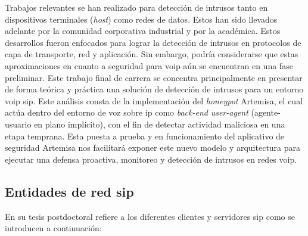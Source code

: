 \documentclass[a4paper,12pt]{report}
\begin{document}
Trabajos relevantes se han realizado para detección de intrusos tanto en
dispositivos terminales (\emph{host}) como redes de datos. Estos han sido
llevados adelante por la comunidad corporativa industrial y por la académica.
Estos desarrollos fueron enfocados para lograr la detección de
intrusos en protocolos de capa de transporte, red y aplicación. Sin embargo,
podría considerarse que estas aproximaciones en cuanto a seguridad para
\ac{voip} aún se encuentran en una fase \mbox{preliminar}. Este trabajo final de carrera
se concentra principalmente en presentar de forma teórica y práctica una
solución de detección de intrusos para un entorno \ac{voip} \ac{sip}.                
Este análisis consta de la implementación del \emph{honeypot} Artemisa, el
cual actúa dentro del entorno de voz sobre \ac{ip} como \emph{back-end} \emph{user-agent}
(agente-usuario en plano implícito), con el fin de detectar actividad maliciosa
en una etapa temprana. Esta puesta a prueba y en funcionamiento del aplicativo
de seguridad Artemisa nos facilitará exponer este nuevo modelo y
arquitectura para ejecutar una defensa proactiva, monitoreo y detección de
intrusos en redes \ac{voip}. \cite{nassarm}

\subsection{Entidades de red \ac{sip}}

En su tesis postdoctoral \cite{nassarm} refiere a los diferentes clientes 
y servidores \ac{sip} como se introducen a continuación:
\end{document}
